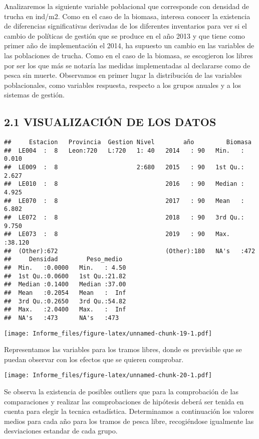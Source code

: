 \documentclass[
]{article}
\begin{document}
Analizaremos la siguiente variable poblacional que corresponde con
densidad de trucha en ind/m2. Como en el caso de la biomasa, interesa
conocer la existencia de diferencias significativas derivadas de los
diferentes inventarios para ver si el cambio de políticas de gestión que
se produce en el año 2013 y que tiene como primer año de implementación
el 2014, ha supuesto un cambio en las variables de las poblaciones de
trucha. Como en el caso de la biomasa, se escogieron los libres por ser
los que más se notaría las medidas implementadas al declararse como de
pesca sin muerte. Observamos en primer lugar la distribución de las
variables poblacionales, como variables respuesta, respecto a los grupos
anuales y a los sistemas de gestión.

\hypertarget{visualizaciuxf3n-de-los-datos-1}{%
\subsection{2.1 VISUALIZACIÓN DE LOS
DATOS}\label{visualizaciuxf3n-de-los-datos-1}}

\begin{verbatim}
##     Estacion   Provincia  Gestion Nivel        año         Biomasa      
##  LE004  :  8   Leon:720   L:720   1: 40   2014   : 90   Min.   : 0.010  
##  LE009  :  8                      2:680   2015   : 90   1st Qu.: 2.627  
##  LE010  :  8                              2016   : 90   Median : 4.925  
##  LE070  :  8                              2017   : 90   Mean   : 6.802  
##  LE072  :  8                              2018   : 90   3rd Qu.: 9.750  
##  LE073  :  8                              2019   : 90   Max.   :38.120  
##  (Other):672                              (Other):180   NA's   :472     
##     Densidad        Peso_medio   
##  Min.   :0.0000   Min.   : 4.50  
##  1st Qu.:0.0600   1st Qu.:21.82  
##  Median :0.1400   Median :37.00  
##  Mean   :0.2054   Mean   :  Inf  
##  3rd Qu.:0.2650   3rd Qu.:54.82  
##  Max.   :2.0400   Max.   :  Inf  
##  NA's   :473      NA's   :473
\end{verbatim}

\texttt{[image: Informe\_files/figure-latex/unnamed-chunk-19-1.pdf]}

Representamos las variables para los tramos libres, donde es previsible
que se puedan observar con los efectos que se quieren comprobar.

\texttt{[image: Informe\_files/figure-latex/unnamed-chunk-20-1.pdf]}

Se observa la existencia de posibles outliers que para la comprobación
de las comparaciones y realizar las comprobaciones de hipótesis deberá
ser tenida en cuenta para elegir la tecnica estadística. Determinamos a
continuación los valores medios para cada año para los tramos de pesca
libre, recogiéndose igualmente las desviaciones estandar de cada grupo.
\end{document}
